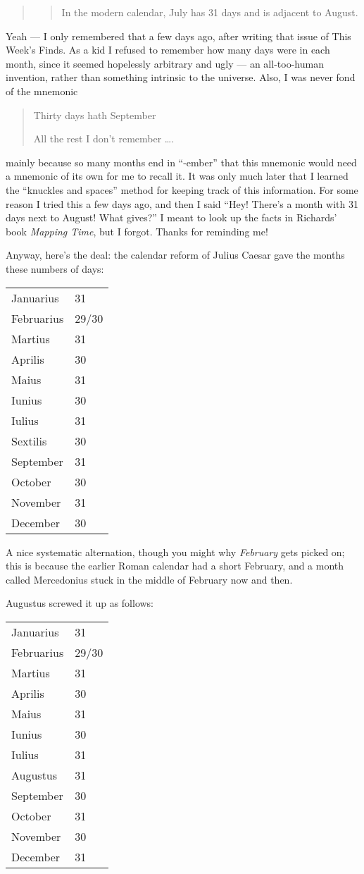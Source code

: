\documentclass{article}
\begin{document}
\begin{quote}
\begin{quote}
In the modern calendar, July has 31 days and is adjacent to August.
\end{quote}
\end{quote}

Yeah --- I only remembered that a few days ago, after writing that issue
of This Week's Finds. As a kid I refused to remember how many days were
in each month, since it seemed hopelessly arbitrary and ugly --- an
all-too-human invention, rather than something intrinsic to the
universe. Also, I was never fond of the mnemonic

\begin{quote}
Thirty days hath September

All the rest I don't remember \ldots.
\end{quote}

mainly because so many months end in ``-ember'' that this mnemonic would
need a mnemonic of its own for me to recall it. It was only much later
that I learned the ``knuckles and spaces'' method for keeping track of
this information. For some reason I tried this a few days ago, and then
I said ``Hey! There's a month with 31 days next to August! What gives?''
I meant to look up the facts in Richards' book \emph{Mapping Time}, but
I forgot. Thanks for reminding me!

Anyway, here's the deal: the calendar reform of Julius Caesar gave the
months these numbers of days:

\begin{longtable}[]{@{}ll@{}}
\toprule
\endhead
Januarius & 31\tabularnewline
Februarius & 29/30\tabularnewline
Martius & 31\tabularnewline
Aprilis & 30\tabularnewline
Maius & 31\tabularnewline
Iunius & 30\tabularnewline
Iulius & 31\tabularnewline
Sextilis & 30\tabularnewline
September & 31\tabularnewline
October & 30\tabularnewline
November & 31\tabularnewline
December & 30\tabularnewline
\bottomrule
\end{longtable}

A nice systematic alternation, though you might why \emph{February} gets
picked on; this is because the earlier Roman calendar had a short
February, and a month called Mercedonius stuck in the middle of February
now and then.

Augustus screwed it up as follows:

\begin{longtable}[]{@{}ll@{}}
\toprule
\endhead
Januarius & 31\tabularnewline
Februarius & 29/30\tabularnewline
Martius & 31\tabularnewline
Aprilis & 30\tabularnewline
Maius & 31\tabularnewline
Iunius & 30\tabularnewline
Iulius & 31\tabularnewline
Augustus & 31\tabularnewline
September & 30\tabularnewline
October & 31\tabularnewline
November & 30\tabularnewline
December & 31\tabularnewline
\bottomrule
\end{longtable}
\end{document}
